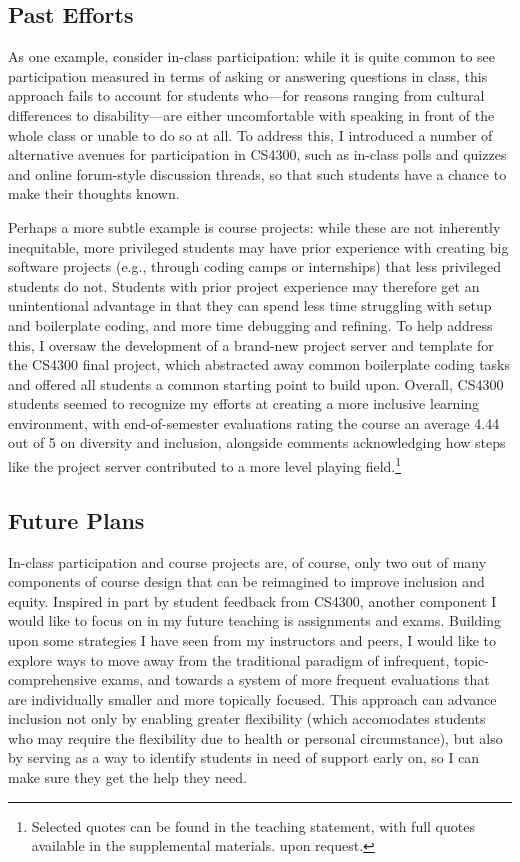 \documentclass[12pt,letterpaper]{article}
\begin{document}
\subsection{Past Efforts}
As one example, consider in-class participation: while it is quite common to see participation measured in terms of asking or answering questions in class, this approach fails to account for students who---for reasons ranging from cultural differences to disability---are either uncomfortable with speaking in front of the whole class or unable to do so at all.
To address this, I introduced a number of alternative avenues for participation in CS4300, such as in-class polls and quizzes and online forum-style discussion threads, so that such students have a chance to make their thoughts known.

Perhaps a more subtle example is course projects: while these are not inherently inequitable, more privileged students may have prior experience with creating big software projects (e.g., through coding camps or internships) that less privileged students do not.
Students with prior project experience may therefore get an unintentional advantage in that they can spend less time struggling with setup and boilerplate coding, and more time debugging and refining.
To help address this, I oversaw the development of a brand-new project server and template for the CS4300 final project, which abstracted away common boilerplate coding tasks and offered all students a common starting point to build upon.
Overall, CS4300 students seemed to recognize my efforts at creating a more inclusive learning environment, with end-of-semester evaluations rating the course an average 4.44 out of 5 on diversity and inclusion, alongside comments acknowledging how steps like the project server contributed to a more level playing field.\footnote{%
Selected quotes can be found in the teaching statement, with full quotes available
\ifsupplementals
in the supplemental materials.
\else
upon request.
\fi
}

\subsection{Future Plans}
In-class participation and course projects are, of course, only two out of many components of course design that can be reimagined to improve inclusion and equity.
Inspired in part by student feedback from CS4300, another component I would like to focus on in my future teaching is assignments and exams.
Building upon some strategies I have seen from my instructors and peers, I would like to explore ways to move away from the traditional paradigm of infrequent, topic-comprehensive exams, and towards a system of more frequent evaluations that are individually smaller and more topically focused.
This approach can advance inclusion not only by enabling greater flexibility (which accomodates students who may require the flexibility due to health or personal circumstance), but also by serving as a way to identify students in need of support early on, so I can make sure they get the help they need.
\end{document}

